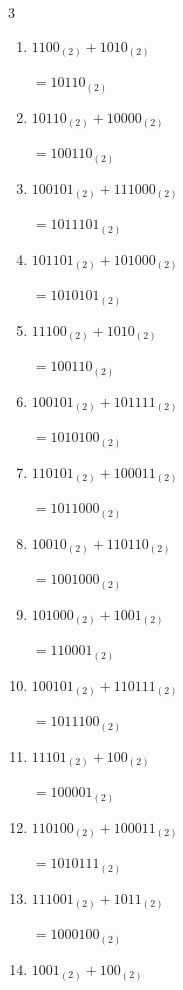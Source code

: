 \begin{multicols}{3}
\begin{enumerate}
        $=100011_{(2)}$

\columnbreak %

  \item $1100_{(2)} + 1010_{(2)}$

        $=10110_{(2)}$

  \item $10110_{(2)} + 10000_{(2)}$

        $=100110_{(2)}$

  \item $100101_{(2)} + 111000_{(2)}$

        $=1011101_{(2)}$

  \item $101101_{(2)} + 101000_{(2)}$

        $=1010101_{(2)}$

  \item $11100_{(2)} + 1010_{(2)}$

        $=100110_{(2)}$

  \item $100101_{(2)} + 101111_{(2)}$

        $=1010100_{(2)}$

  \item $110101_{(2)} + 100011_{(2)}$

        $=1011000_{(2)}$

  \item $10010_{(2)} + 110110_{(2)}$

        $=1001000_{(2)}$

  \item $101000_{(2)} + 1001_{(2)}$

        $=110001_{(2)}$

  \item $100101_{(2)} + 110111_{(2)}$

        $=1011100_{(2)}$

\columnbreak %

  \item $11101_{(2)} + 100_{(2)}$

        $=100001_{(2)}$

  \item $110100_{(2)} + 100011_{(2)}$

        $=1010111_{(2)}$

  \item $111001_{(2)} + 1011_{(2)}$

        $=1000100_{(2)}$

  \item $1001_{(2)} + 100_{(2)}$


\end{enumerate}
\end{multicols}
